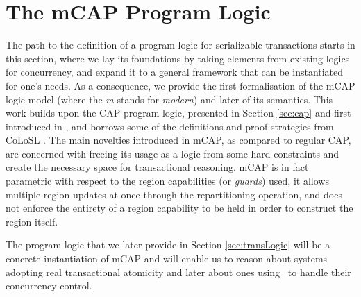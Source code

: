 \chapter{The mCAP Program Logic}

\label{sec:mcapModel}

The path to the definition of a program logic for serializable transactions starts in this section, where we lay its foundations by taking elements from existing logics for concurrency, and expand it to a general framework that can be instantiated for one's needs. As a consequence, we provide the first formalisation of the mCAP logic model (where the \textit{m} stands for \textit{modern}) and later of its semantics. This work builds upon the CAP program logic, presented in Section \ref{sec:cap} and first introduced in \cite{cap}, and borrows some of the definitions and proof strategies from CoLoSL \cite{colosl}. The main novelties introduced in mCAP, as compared to regular CAP, are concerned with freeing its usage as a logic from some hard constraints and create the necessary space for transactional reasoning. mCAP is in fact parametric with respect to the region capabilities (or \textit{guards}) used, it allows multiple region updates at once through the repartitioning operation, and does not enforce the entirety of a region capability to be held in order to construct the region itself.

The program logic that we later provide in Section \ref{sec:transLogic} will be a concrete instantiation of mCAP and will enable us to reason about systems adopting real transactional atomicity and later about ones using \tpl\ to handle their concurrency control.





